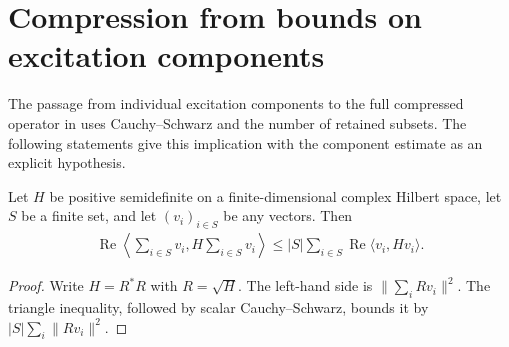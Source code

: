 \section{Compression from bounds on excitation components}
\label{sec:replica_excitation_compression}

The passage from individual excitation components to the full compressed
operator in \cite[Section~7, lines~577--590]{OpenAI2026AreaLaw} uses
Cauchy--Schwarz and the number of retained subsets. The following statements
give this implication with the component estimate as an explicit hypothesis.

\begin{theorem}
  \label{thm:positive_form_finite_sum}
  Let $H$ be positive semidefinite on a finite-dimensional complex Hilbert
  space, let $S$ be a finite set, and let $(v_i)_{i\in S}$ be any vectors.
  Then
  \begin{align}
    \operatorname{Re}\left\langle\sum_{i\in S}v_i,
      H\sum_{i\in S}v_i\right\rangle
    \le |S|\sum_{i\in S}\operatorname{Re}\langle v_i,Hv_i\rangle.
  \end{align}
\end{theorem}
\begin{proof}
  Write $H=R^*R$ with $R=\sqrt H$. The left-hand side is
  $\|\sum_i Rv_i\|^2$. The triangle inequality, followed by scalar
  Cauchy--Schwarz, bounds it by $|S|\sum_i\|Rv_i\|^2$.
\end{proof}

